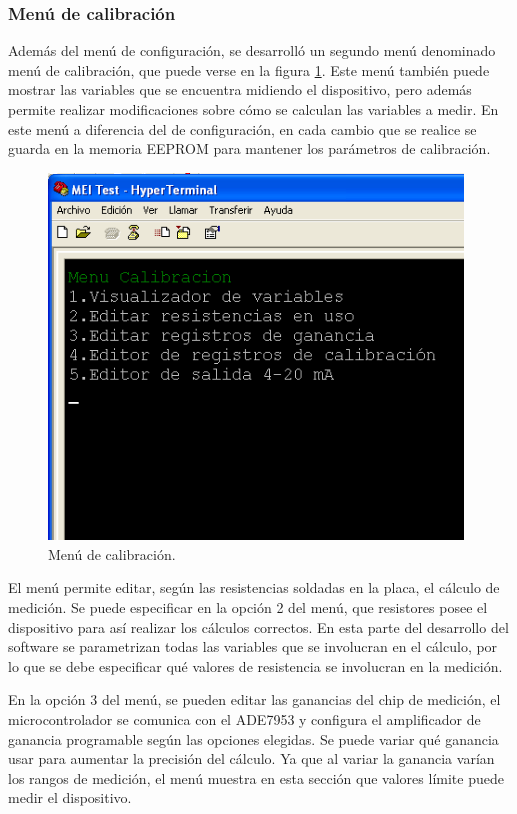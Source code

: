 \subsubsection{Menú de calibración }

Además del menú de configuración, se desarrolló un segundo menú denominado menú de calibración, que puede verse en la figura \ref{fig:calibmenu}. Este menú también puede mostrar las variables que se encuentra midiendo el dispositivo, pero además permite realizar modificaciones sobre cómo se calculan las variables a medir. En este menú a diferencia del de configuración, en cada cambio que se realice se guarda en la memoria EEPROM para mantener los parámetros de calibración.

\begin{figure}[!htb]
	\centering
	\includegraphics[width=110mm,keepaspectratio]{Figures/MenuCalib1.png}
	\caption{Menú de calibración.}
	\label{fig:calibmenu}
\end{figure}

El menú permite editar, según las resistencias soldadas en la placa, el cálculo de medición. Se puede especificar en la opción 2 del menú, que resistores posee el dispositivo para así realizar los cálculos correctos. En esta parte del desarrollo del software se parametrizan todas las variables que se involucran en el cálculo, por lo que se debe especificar qué valores de resistencia se involucran en la medición.

En la opción 3 del menú, se pueden editar las ganancias del chip de medición, el microcontrolador se comunica con el ADE7953 y configura el amplificador de ganancia programable según las opciones elegidas. Se puede variar qué ganancia usar para aumentar la precisión del cálculo. Ya que al variar la ganancia varían los rangos de medición, el menú muestra en esta sección que valores límite puede medir el dispositivo.

